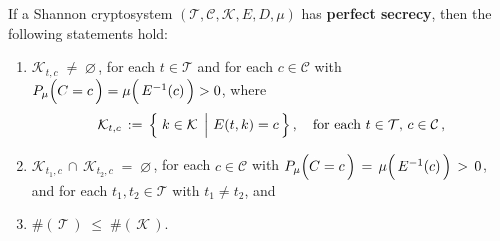 \vskip 0.5cm
\begin{proposition}
\mbox{}
\vskip 0.1cm
\noindent
If a Shannon cryptosystem
$(\mathcal{T},\mathcal{C},\mathcal{K},E,D,\mu)$
has \textbf{perfect secrecy}, then the following statements hold:
\begin{enumerate}
\item
	$\mathcal{K}_{t,c} \; \neq \; \varnothing$\,,
	for each $t \in \mathcal{T}$
	and
	for each $c \in \mathcal{C}$
	with $P_{\mu}\!\left(\overset{{\color{white}.}}{C}=c\,\right) =
	\mu\!\left(\,\overset{{\color{white}.}}{E^{-1}}(c)\,\right) > 0 $,
	where
	\begin{equation*}
	\mathcal{K}_{t,c} \, := \, \left\{\,\left. k \overset{{\color{white}.}}{\in} \mathcal{K} \;\,\right\vert\, E(t,k) = c\,\right\},
	\quad\textnormal{for each $t\in\mathcal{T}$, $c \in \mathcal{C}$}\,,
	\end{equation*}
\item
	$\mathcal{K}_{t_{1},c} \,\cap\, \mathcal{K}_{t_{2},c} \; = \; \varnothing$\,,\;
	for each $c \in \mathcal{C}$
	with $P_{\mu}\!\left(\overset{{\color{white}.}}{C}=c\,\right) \,=\,
	\mu\!\left(\,\overset{{\color{white}.}}{E^{-1}}(c)\,\right) \,>\, 0$,
	and for each $t_{1}, t_{2} \in \mathcal{T}$ with $t_{1} \neq t_{2}$,
	and
\item
	$\#\!\left(\,\mathcal{T}\,\right) \; \leq \; \#\!\left(\,\mathcal{K}\,\right)$.
\end{enumerate}
\end{proposition}

